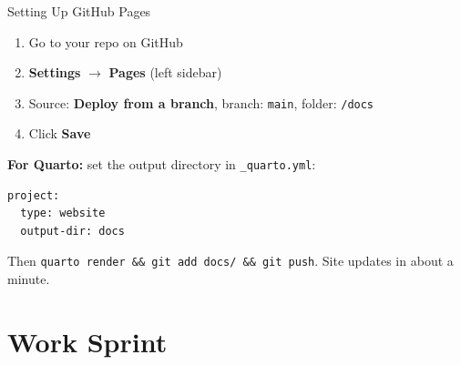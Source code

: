 \begin{frame}[fragile]{Setting Up GitHub Pages}
  \small
  \begin{enumerate}\setlength\itemsep{1pt}
    \item Go to your repo on GitHub
    \item \textbf{Settings} $\to$ \textbf{Pages} (left sidebar)
    \item Source: \textbf{Deploy from a branch}, branch: \texttt{main}, folder: \texttt{/docs}
    \item Click \textbf{Save}
  \end{enumerate}

  \vspace{4pt}

  \textbf{For Quarto:} set the output directory in \texttt{\_quarto.yml}:

  \begin{lstlisting}[style=terminal,basicstyle=\ttfamily\scriptsize]
project:
  type: website
  output-dir: docs
  \end{lstlisting}

  \vspace{2pt}

  Then \texttt{quarto render \&\& git add docs/ \&\& git push}. Site updates in about a minute.
\end{frame}

\section{Work Sprint}

